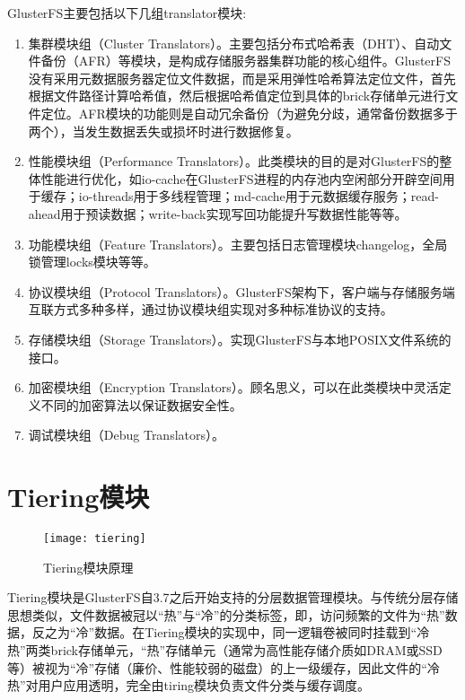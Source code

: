 GlusterFS主要包括以下几组translator模块:
\begin{enumerate}
    \item 集群模块组（Cluster Translators）。主要包括分布式哈希表（DHT）、自动文件备份（AFR）等模块，是构成存储服务器集群功能的核心组件。GlusterFS没有采用元数据服务器定位文件数据，而是采用弹性哈希算法定位文件，首先根据文件路径计算哈希值，然后根据哈希值定位到具体的brick存储单元进行文件定位。AFR模块的功能则是自动冗余备份（为避免分歧，通常备份数据多于两个），当发生数据丢失或损坏时进行数据修复。
    \item 性能模块组（Performance Translators）。此类模块的目的是对GlusterFS的整体性能进行优化，如io-cache在GlusterFS进程的内存池内空闲部分开辟空间用于缓存；io-threads用于多线程管理；md-cache用于元数据缓存服务；read-ahead用于预读数据；write-back实现写回功能提升写数据性能等等。
    \item 功能模块组（Feature Translators）。主要包括日志管理模块changelog，全局锁管理locks模块等等。
    \item 协议模块组（Protocol Translators）。GlusterFS架构下，客户端与存储服务端互联方式多种多样，通过协议模块组实现对多种标准协议的支持。
    \item 存储模块组（Storage Translators）。实现GlusterFS与本地POSIX文件系统的接口。
    \item 加密模块组（Encryption Translators）。顾名思义，可以在此类模块中灵活定义不同的加密算法以保证数据安全性。
    \item 调试模块组（Debug Translators）。
\end{enumerate}

\section{Tiering模块}
\begin{figure}[htp]
\centering
\texttt{[image: tiering]}
\caption{Tiering模块原理}
\label{fig:tiering}
\end{figure}
Tiering模块是GlusterFS自3.7之后开始支持的分层数据管理模块\cite{Tiering}。与传统分层存储思想类似，文件数据被冠以“热”与“冷”的分类标签，即，访问频繁的文件为“热”数据，反之为“冷”数据。在Tiering模块的实现中，同一逻辑卷被同时挂载到“冷热”两类brick存储单元，“热”存储单元（通常为高性能存储介质如DRAM或SSD等）被视为“冷”存储（廉价、性能较弱的磁盘）的上一级缓存，因此文件的“冷热”对用户应用透明，完全由tiring模块负责文件分类与缓存调度。

